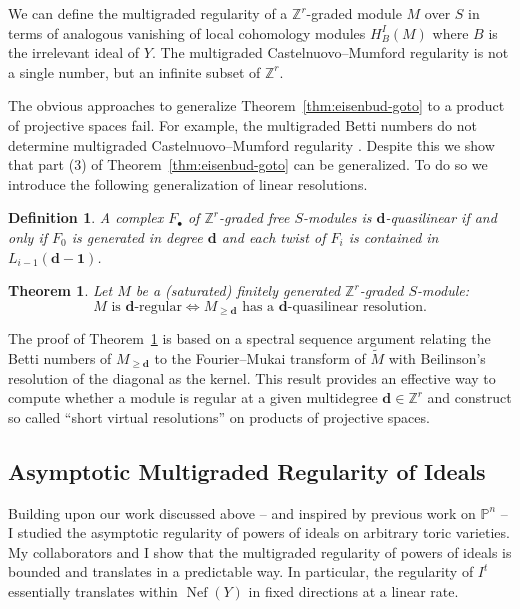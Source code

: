 \documentclass[11pt,reqno]{amsart}
\newtheorem{theorem}[lemma]{Theorem}
\newtheorem{defn}[lemma]{Definition}
\theoremstyle{remark}
\newcommand{\Nef}{\operatorname{Nef}}
\newcommand{\dd}{\mathbf{d}}
\newcommand{\one}{\mathbf{1}}
\newcommand{\PP}{\mathbb{P}}
\newcommand{\ZZ}{\mathbb{Z}}
\begin{document}
We can define the multigraded regularity of a $\ZZ^r$-graded module $M$ over $S$ in terms of analogous vanishing of local cohomology modules $H_{B}^I(M)$ where $B$ is the irrelevant ideal of $Y$. The multigraded Castelnuovo--Mumford regularity is not a single number, but an infinite subset of $\ZZ^{r}$. 

The obvious approaches to generalize Theorem~\ref{thm:eisenbud-goto} to a product of projective spaces fail. For example, the multigraded Betti numbers do not determine multigraded Castelnuovo--Mumford regularity \cite[Example 5.1]{bruceHellerSayrafi21}. Despite this we show that part (3) of Theorem~\ref{thm:eisenbud-goto} can be generalized. To do so we introduce the following generalization of linear resolutions. 

\begin{defn}\label{defn:quasilinear}
A complex $F_{\bullet}$ of $\ZZ^{r}$-graded free $S$-modules is $\dd$-quasilinear if and only if $F_{0}$ is generated in degree $\dd$ and each twist of $F_{i}$ is contained in $L_{i-1}(\dd-\one)$.
\end{defn}

\begin{theorem}\cite[Theorem A]{bruceHellerSayrafi21}\label{thm:mgreg-main}
Let $M$ be a (saturated) finitely generated $\ZZ^{r}$-graded $S$-module:
\[
\text{$M$ is $\dd$-regular} \iff  \text{$M_{\geq\dd}$ has a $\dd$-quasilinear resolution}.
\]
\end{theorem}

The proof of Theorem~\ref{thm:mgreg-main} is based on a spectral sequence argument relating the Betti numbers of $M_{\geq\dd}$ to the Fourier--Mukai transform of $\widetilde{M}$ with Beilinson's resolution of the diagonal as the kernel. This result provides an effective way to compute whether a module is regular at a given multidegree $\dd \in \ZZ^r$ and construct so called ``short virtual resolutions'' on products of projective spaces. 

\subsection{Asymptotic Multigraded Regularity of Ideals}

Building upon our work discussed above -- and inspired by previous work on $\PP^{n}$ \cite{BEL91,CHT99,Kodiyalam00} -- I studied the asymptotic regularity of powers of ideals on arbitrary toric varieties. My collaborators and I show that the multigraded regularity of powers of ideals is bounded and translates in a predictable way. In particular, the regularity of $I^{t}$ essentially translates within $\Nef(Y)$ in fixed directions at a linear rate.
 
\end{document}
